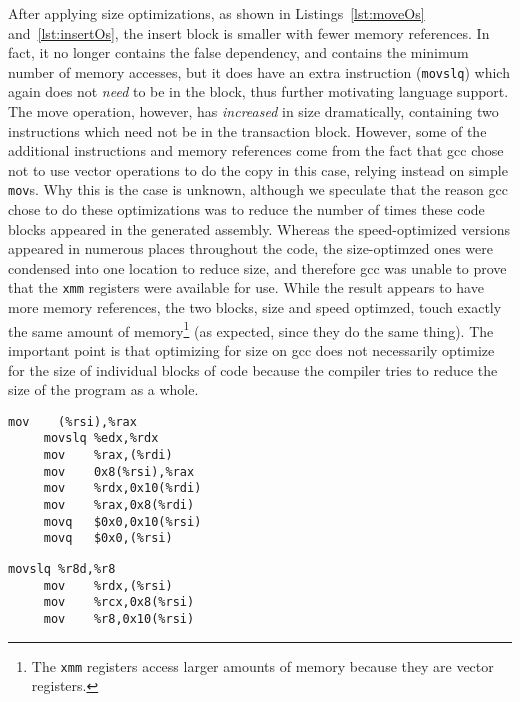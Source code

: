After applying size optimizations, as shown in Listings~\ref{lst:moveOs}
and~\ref{lst:insertOs}, the insert block is smaller with fewer memory
references. In fact, it no longer contains the false dependency, and contains
the minimum number of memory accesses, but it does have
an extra instruction (\texttt{movslq}) which again does not \textit{need} to be in the block, thus
further motivating language support. The move operation, however, has
\textit{increased} in size dramatically, containing two instructions which need
not be in the transaction block. However, some of the additional instructions
and memory references come from the fact that gcc chose not to use vector
operations to do the copy in this case, relying instead on simple \texttt{mov}s.
Why this is the case is unknown, although we speculate that the reason gcc
chose to do these optimizations was to reduce the number of times these code
blocks appeared in the generated assembly. Whereas the speed-optimized versions
appeared in numerous places throughout the code, the size-optimzed ones were
condensed into one location to reduce size, and therefore gcc was unable to
prove that the \texttt{xmm} registers were available for use. While the result
appears to have more memory references, the two blocks, size and speed optimzed,
touch exactly the same amount of memory\footnote{The \texttt{xmm} registers
access larger amounts of memory because they are vector registers.}
(as expected, since they do the same thing).
The important point is that optimizing for size on gcc does not necessarily
optimize for the size of individual blocks of code because the compiler tries to
reduce the size of the program as a whole.




\begin{lstlisting}[caption={Transaction code generation for do\_move, optimized for size.
Eight instructions, seven memory accesses (five writes).},label=lst:moveOs]
     mov    (%rsi),%rax
     movslq %edx,%rdx
     mov    %rax,(%rdi)
     mov    0x8(%rsi),%rax
     mov    %rdx,0x10(%rdi)
     mov    %rax,0x8(%rdi)
     movq   $0x0,0x10(%rsi)
     movq   $0x0,(%rsi)
\end{lstlisting}

\begin{lstlisting}[caption={Transaction code generation for do\_insert, optimized for size.
Four instructions, three memory accesses (three writes).},label=lst:insertOs]
     movslq %r8d,%r8
     mov    %rdx,(%rsi)
     mov    %rcx,0x8(%rsi)
     mov    %r8,0x10(%rsi)
\end{lstlisting}



